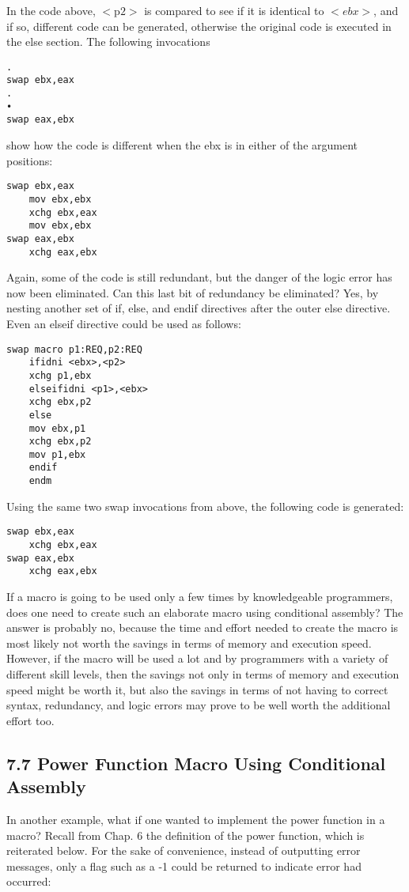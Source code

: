 \documentclass[10pt]{article}
\begin{document}
In the code above, $<\mathrm{p} 2>$ is compared to see if it is identical to $<e b x>$, and if so, different code can be generated, otherwise the original code is executed in the else section. The following invocations

\begin{verbatim}
.
swap ebx,eax
.
•
swap eax,ebx
\end{verbatim}

show how the code is different when the ebx is in either of the argument positions:

\begin{verbatim}
swap ebx,eax
    mov ebx,ebx
    xchg ebx,eax
    mov ebx,ebx
swap eax,ebx
    xchg eax,ebx
\end{verbatim}

Again, some of the code is still redundant, but the danger of the logic error has now been eliminated. Can this last bit of redundancy be eliminated? Yes, by nesting another set of if, else, and endif directives after the outer else directive. Even an elseif directive could be used as follows:

\begin{verbatim}
swap macro p1:REQ,p2:REQ
    ifidni <ebx>,<p2>
    xchg p1,ebx
    elseifidni <p1>,<ebx>
    xchg ebx,p2
    else
    mov ebx,p1
    xchg ebx,p2
    mov p1,ebx
    endif
    endm
\end{verbatim}

Using the same two swap invocations from above, the following code is generated:

\begin{verbatim}
swap ebx,eax
    xchg ebx,eax
swap eax,ebx
    xchg eax,ebx
\end{verbatim}

If a macro is going to be used only a few times by knowledgeable programmers, does one need to create such an elaborate macro using conditional assembly? The answer is probably no, because the time and effort needed to create the macro is most likely not worth the savings in terms of memory and execution speed. However, if the macro will be used a lot and by programmers with a variety of different skill levels, then the savings not only in terms of memory and execution speed might be worth it, but also the savings in terms of not having to correct syntax, redundancy, and logic errors may prove to be well worth the additional effort too.

\subsection*{7.7 Power Function Macro Using Conditional Assembly}
In another example, what if one wanted to implement the power function in a macro? Recall from Chap. 6 the definition of the power function, which is reiterated below. For the sake of convenience, instead of outputting error messages, only a flag such as a -1 could be returned to indicate error had occurred:
\end{document}
